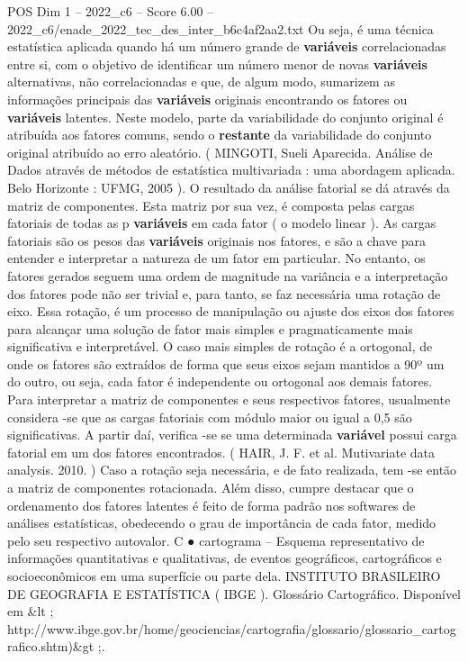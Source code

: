 \begin{textsample}{POS Dim 1 – 2022\_c6 – Score 6.00 – 2022\_c6/enade\_2022\_tec\_des\_inter\_b6c4af2aa2.txt}
Ou seja, é uma técnica estatística aplicada quando há um número grande de \textbf{variáveis} correlacionadas entre si, com o objetivo de identificar um número menor de novas \textbf{variáveis} alternativas, não correlacionadas e que, de algum modo, sumarizem as informações principais das \textbf{variáveis} originais encontrando os fatores ou \textbf{variáveis} latentes.
Neste modelo, parte da variabilidade do conjunto original é atribuída aos fatores comuns, sendo o \textbf{restante} da variabilidade do conjunto original atribuído ao erro aleatório. ( MINGOTI, Sueli Aparecida.
Análise de Dados através de métodos de estatística multivariada : uma abordagem aplicada.
Belo Horizonte : UFMG, 2005 ).
O resultado da análise fatorial se dá através da matriz de componentes.
Esta matriz por sua vez, é composta pelas cargas fatoriais de todas as p \textbf{variáveis} em cada fator ( o modelo linear ).
As cargas fatoriais são os pesos das \textbf{variáveis} originais nos fatores, e são a chave para entender e interpretar a natureza de um fator em particular.
No entanto, os fatores gerados seguem uma ordem de magnitude na variância e a interpretação dos fatores pode não ser trivial e, para tanto, se faz necessária uma rotação de eixo.
Essa rotação, é um processo de manipulação ou ajuste dos eixos dos fatores para alcançar uma solução de fator mais simples e pragmaticamente mais significativa e interpretável.
O caso mais simples de rotação é a ortogonal, de onde os fatores são extraídos de forma que seus eixos sejam mantidos a 90º um do outro, ou seja, cada fator é independente ou ortogonal aos demais fatores.
Para interpretar a matriz de componentes e seus respectivos fatores, usualmente considera -se que as cargas fatoriais com módulo maior ou igual a 0,5 são significativas.
A partir daí, verifica -se se uma determinada \textbf{variável} possui carga fatorial em um dos fatores encontrados. ( HAIR, J.
F. et al.
Mutivariate data analysis. 2010. ) Caso a rotação seja necessária, e de fato realizada, tem -se então a matriz de componentes rotacionada.
Além disso, cumpre destacar que o ordenamento dos fatores latentes é feito de forma padrão nos softwares de análises estatísticas, obedecendo o grau de importância de cada fator, medido pelo seu respectivo autovalor.
C {\EmojiFont ●} cartograma – Esquema representativo de informações quantitativas e qualitativas, de eventos geográficos, cartográficos e socioeconômicos em uma superfície ou parte dela.
INSTITUTO BRASILEIRO DE GEOGRAFIA E ESTATÍSTICA ( IBGE ).
Glossário Cartográfico.
Disponível em \&lt ; http://www.ibge.gov.br/home/geociencias/cartografia/glossario/glossario\_cartografico.shtm)\&gt ;.

\end{textsample}
